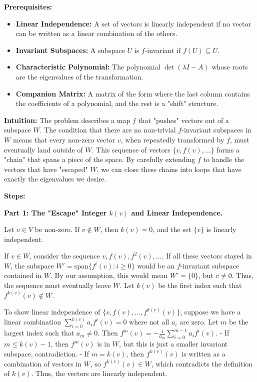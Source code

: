 \begin{solution}
\textbf{Prerequisites:}
\begin{itemize}
    \item \textbf{Linear Independence:} A set of vectors is linearly independent if no vector can be written as a linear combination of the others.
    \item \textbf{Invariant Subspaces:} A subspace $U$ is $f$-invariant if $f(U) \subseteq U$.
    \item \textbf{Characteristic Polynomial:} The polynomial $\det(\lambda I - A)$ whose roots are the eigenvalues of the transformation.
    \item \textbf{Companion Matrix:} A matrix of the form where the last column contains the coefficients of a polynomial, and the rest is a "shift" structure.
\end{itemize}

\bigskip

\textbf{Intuition:}
The problem describes a map $f$ that "pushes" vectors out of a subspace $W$. The condition that there are no non-trivial $f$-invariant subspaces in $W$ means that every non-zero vector $v$, when repeatedly transformed by $f$, must eventually land outside of $W$. This sequence of vectors $\{v, f(v), \dots\}$ forms a "chain" that spans a piece of the space. By carefully extending $f$ to handle the vectors that have "escaped" $W$, we can close these chains into loops that have exactly the eigenvalues we desire.

\bigskip

\textbf{Steps:}

\textbf{Part 1: The "Escape" Integer $k(v)$ and Linear Independence.}

Let $v \in V$ be non-zero. If $v \notin W$, then $k(v)=0$, and the set $\{v\}$ is linearly independent.

\bigskip

If $v \in W$, consider the sequence $v, f(v), f^2(v), \dots$. If all these vectors stayed in $W$, the subspace $W' = \mathrm{span}\{f^i(v) : i \geq 0\}$ would be an $f$-invariant subspace contained in $W$. By our assumption, this would mean $W' = \{0\}$, but $v \neq 0$. Thus, the sequence must eventually leave $W$. Let $k(v)$ be the first index such that $f^{k(v)}(v) \notin W$.

\bigskip

To show linear independence of $\{v, f(v), \dots, f^{k(v)}(v)\}$, suppose we have a linear combination $\sum_{i=0}^{k(v)} a_i f^i(v) = 0$ where not all $a_i$ are zero. Let $m$ be the largest index such that $a_m \neq 0$. Then $f^m(v) = -\frac{1}{a_m} \sum_{i=0}^{m-1} a_i f^i(v)$. 
- If $m \leq k(v)-1$, then $f^m(v)$ is in $W$, but this is just a smaller invariant subspace, contradiction.
- If $m = k(v)$, then $f^{k(v)}(v)$ is written as a combination of vectors in $W$, so $f^{k(v)}(v) \in W$, which contradicts the definition of $k(v)$. Thus, the vectors are linearly independent.


\end{solution}

